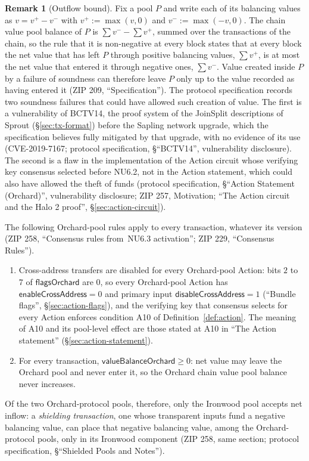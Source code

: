 \documentclass[11pt,a4paper]{article}
\theoremstyle{definition}
\newtheorem{remark}[theorem]{Remark}
\begin{document}
\begin{remark}[Outflow bound]
Fix a pool $P$ and write each of its balancing values as
$v = v^{+} - v^{-}$ with $v^{+} := \max(v, 0)$ and
$v^{-} := \max(-v, 0)$. The chain value pool balance of $P$ is
$\sum v^{-} - \sum v^{+}$, summed over the transactions of the chain, so the
rule that it is non-negative at every block states that at every block the
net value that has left $P$ through positive balancing values, $\sum v^{+}$,
is at most the net value that entered it through negative ones,
$\sum v^{-}$. Value created inside $P$ by a failure of soundness can
therefore leave $P$ only up to the value recorded as having entered it (ZIP
209, ``Specification''). The protocol specification records two soundness
failures that could have allowed such creation of value. The first is a
vulnerability of BCTV14, the proof system of the JoinSplit descriptions of
Sprout (\S\ref{sec:tx-format}) before the Sapling network upgrade, which the
specification believes fully mitigated by that upgrade, with no evidence of
its use (CVE-2019-7167; protocol specification, \S``BCTV14'', vulnerability
disclosure). The second is a flaw in the implementation of the Action
circuit whose verifying key consensus selected before NU6.2, not in the
Action statement, which could also have allowed the theft of funds (protocol
specification, \S``Action Statement (Orchard)'', vulnerability disclosure;
ZIP 257, Motivation; ``The Action circuit and the Halo 2 proof'',
\S\ref{sec:action-circuit}).
\end{remark}

The following Orchard-pool rules apply to every transaction, whatever its
version (ZIP 258, ``Consensus rules from~NU6.3 activation''; ZIP 229,
``Consensus Rules'').
\begin{enumerate}[label=(\roman*)]
\item Cross-address transfers are disabled for every Orchard-pool Action:
  bits $2$ to~$7$ of $\mathsf{flagsOrchard}$ are $0$, so every Orchard-pool
  Action has $\mathsf{enableCrossAddress} = 0$ and primary input
  $\mathsf{disableCrossAddress} = 1$ (``Bundle flags'',
  \S\ref{sec:action-flags}), and the verifying key that consensus selects
  for every Action enforces condition A10 of Definition~\ref{def:action}.
  The meaning of A10 and its pool-level effect are those stated at A10 in
  ``The Action statement'' (\S\ref{sec:action-statement}).
\item For every transaction, $\mathsf{valueBalanceOrchard} \ge 0$: net
  value may leave the Orchard pool and never enter it, so the Orchard chain
  value pool balance never increases.
\end{enumerate}
Of the two Orchard-protocol pools, therefore, only the Ironwood pool accepts
net inflow: a \emph{shielding transaction}, one whose transparent inputs
fund a negative balancing value, can place that negative balancing value,
among the Orchard-protocol pools, only in its Ironwood component (ZIP 258,
same section; protocol specification, \S``Shielded Pools and Notes'').
\end{document}
